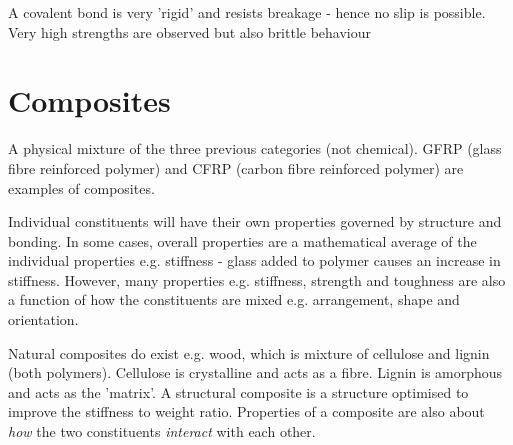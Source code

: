 \documentclass[class=report, crop=false, 12pt,a4paper]{standalone}
\begin{document}
A covalent bond is very 'rigid' and resists breakage - hence no slip is possible. Very high strengths are observed but also brittle behaviour
\section{Composites}
A physical mixture of the three previous categories (not chemical). GFRP (glass fibre reinforced polymer) and CFRP (carbon fibre reinforced polymer) are examples of composites.

Individual constituents will have their own properties governed by structure and bonding. In some cases, overall properties are a mathematical average of the individual properties e.g. stiffness - glass added to polymer causes an increase in stiffness. However, many properties e.g. stiffness, strength and toughness are also a function of how the constituents are mixed e.g. arrangement, shape and orientation. 

Natural composites do exist e.g. wood, which is mixture of cellulose and lignin (both polymers). Cellulose is crystalline and acts as a fibre. Lignin is amorphous and acts as the 'matrix'. A structural composite is a structure optimised to improve the stiffness to weight ratio. Properties of a composite are also about \emph{how} the two constituents \emph{interact} with each other.
\end{document}

